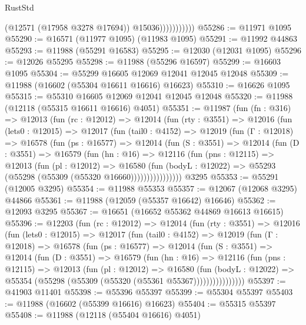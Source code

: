 \begin{lexlean}{RustStd}
\begin{coremodule}
                          (@12571 (@17958 @3278 @17694))
                          @15036)))))))))))
@55286 := @11971 @1095
@55290 := @16571 (@11977 @1095) (@11983 @1095)
@55291 := @11992 @44863
@55293 := @11988 (@55291 @16583)
@55295 := @12030 (@12031 @1095)
@55296 := @12026 @55295
@55298 := @11988 (@55296 @16597)
@55299 := @16603 @1095
@55304 := @55299 @16605 @12069 @12041 @12045 @12048
@55309 := @11988 (@16602 (@55304 @16611 @16616) @16623)
@55310 := @16626 @1095
@55315 := @55310 @16605 @12069 @12041 @12045 @12048
@55320 := @11988 (@12118 (@55315 @16611 @16616) @4051)
@55351 := @11987
    (fun (fn : @316) =>
    @12013
      (fun (rc : @12012) =>
      @12014
        (fun (rty : @3551) =>
        @12016
          (fun (lets0 : @12015) =>
          @12017
            (fun (tail0 : @4152) =>
            @12019
              (fun (Γ : @12018) =>
              @16578
                (fun (ps : @16577) =>
                @12014
                  (fun (S : @3551) =>
                  @12014
                    (fun (D : @3551) =>
                    @16579
                      (fun (hn : @16) =>
                      @12116
                        (fun (pns : @12115) =>
                        @12013
                          (fun (pl : @12012) =>
                          @16580
                            (fun (bodyL : @12022) =>
                            @55293 (@55298 (@55309 (@55320 @16660))))))))))))))))
    @3295
@55353 := @55291 (@12005 @3295)
@55354 := @11988 @55353
@55357 := @12067 (@12068 @3295) @44866
@55361 := @11988 (@12059 (@55357 @16642) @16646)
@55362 := @12093 @3295
@55367 := @16651 (@16652 @55362 @44869 @16613 @16615)
@55396 := @12203
    (fun (rc : @12012) =>
    @12014
      (fun (rty : @3551) =>
      @12016
        (fun (lets0 : @12015) =>
        @12017
          (fun (tail0 : @4152) =>
          @12019
            (fun (Γ : @12018) =>
            @16578
              (fun (ps : @16577) =>
              @12014
                (fun (S : @3551) =>
                @12014
                  (fun (D : @3551) =>
                  @16579
                    (fun (hn : @16) =>
                    @12116
                      (fun (pns : @12115) =>
                      @12013
                        (fun (pl : @12012) =>
                        @16580
                          (fun (bodyL : @12022) =>
                          @55354 (@55298 (@55309 (@55320 (@55361 @55367))))))))))))))))
@55397 := @41903 @11401
@55398 := @55396 @55397
@55399 := @55304 @55397
@55403 := @11988 (@16602 (@55399 @16616) @16623)
@55404 := @55315 @55397
@55408 := @11988 (@12118 (@55404 @16616) @4051)

\end{coremodule}
\end{lexlean}
